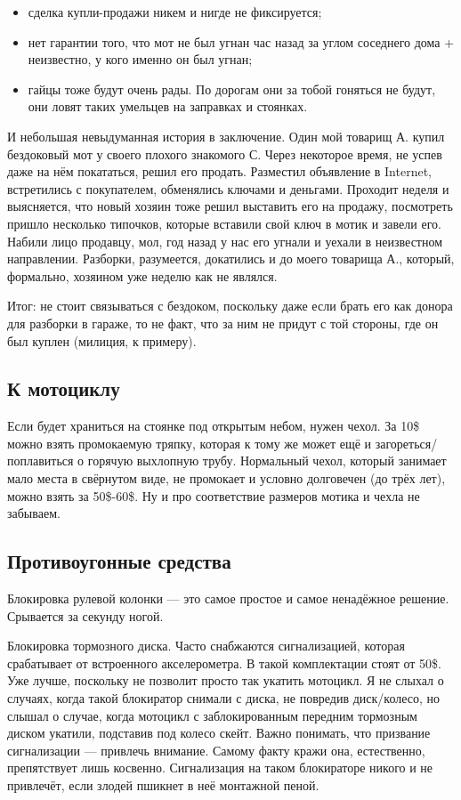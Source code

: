 \documentclass[12pt,a4paper]{article}
\begin{document}
\begin{itemize}
\item сделка купли-продажи никем и нигде не фиксируется;
\item нет гарантии того, что мот не был угнан час назад за углом
соседнего дома + неизвестно, у кого именно он был угнан;
\item гайцы тоже будут очень рады. По дорогам они за тобой гоняться
не будут, они ловят таких умельцев на заправках и стоянках.
\end{itemize}

И небольшая невыдуманная история в заключение. Один мой товарищ А. купил
бездоковый мот у своего плохого знакомого С. Через некоторое время,
не успев даже на нём покататься, решил его продать. Разместил
объявление в Internet, встретились с покупателем, обменялись ключами
и деньгами. Проходит неделя и выясняется, что новый хозяин тоже
решил выставить его на продажу, посмотреть пришло несколько
типочков, которые вставили свой ключ в мотик и завели его. Набили
лицо продавцу, мол, год назад у нас его угнали и уехали в неизвестном
направлении. Разборки, разумеется, докатились и до моего товарища А.,
который, формально, хозяином уже неделю как не являлся.

Итог: не стоит связываться с бездоком, поскольку даже если брать его
как донора для разборки в гараже, то не факт, что за ним не придут с той
стороны, где он был куплен (милиция, к примеру).

\subsection{К мотоциклу}

Если будет храниться на стоянке под открытым небом, нужен чехол. За
10\$ можно взять промокаемую тряпку, которая к тому же может ещё и
загореться/поплавиться о горячую выхлопную трубу. Нормальный чехол,
который занимает мало места в свёрнутом виде, не промокает и условно
долговечен (до трёх лет), можно взять за 50\$-60\$.
Ну и про соответствие размеров мотика и чехла не забываем.

\subsection{Противоугонные средства}

Блокировка рулевой колонки --- это самое простое и самое ненадёжное
решение. Срывается за секунду ногой.

Блокировка тормозного диска. Часто снабжаются сигнализацией, которая
срабатывает от встроенного акселерометра. В такой комплектации стоят
от 50\$. Уже лучше, поскольку не позволит просто так укатить мотоцикл.
Я не слыхал о случаях, когда такой блокиратор снимали с диска, не
повредив диск/колесо, но слышал о случае, когда мотоцикл с заблокированным
передним тормозным диском укатили, подставив под колесо скейт.
Важно понимать, что призвание сигнализации --- привлечь внимание.
Самому факту кражи она, естественно, препятствует лишь косвенно.
Сигнализация на таком блокираторе никого и не привлечёт, если злодей
пшикнет в неё монтажной пеной.
\end{document}
